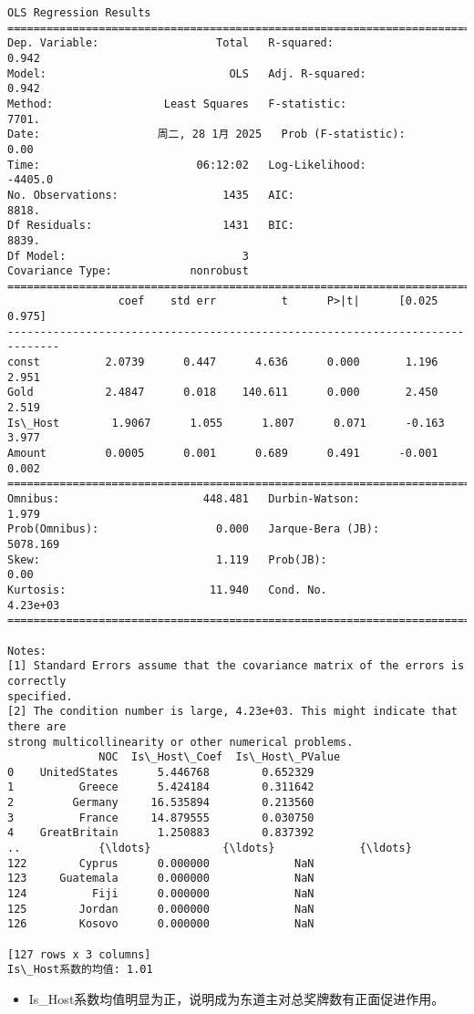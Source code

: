 \documentclass[11pt]{article}
\providecommand{\tightlist}{%
      \setlength{\itemsep}{0pt}\setlength{\parskip}{0pt}}
\begin{document}
    \begin{Verbatim}[commandchars=\\\{\}]
                            OLS Regression Results
==============================================================================
Dep. Variable:                  Total   R-squared:                       0.942
Model:                            OLS   Adj. R-squared:                  0.942
Method:                 Least Squares   F-statistic:                     7701.
Date:                  周二, 28 1月 2025   Prob (F-statistic):               0.00
Time:                        06:12:02   Log-Likelihood:                -4405.0
No. Observations:                1435   AIC:                             8818.
Df Residuals:                    1431   BIC:                             8839.
Df Model:                           3
Covariance Type:            nonrobust
==============================================================================
                 coef    std err          t      P>|t|      [0.025      0.975]
------------------------------------------------------------------------------
const          2.0739      0.447      4.636      0.000       1.196       2.951
Gold           2.4847      0.018    140.611      0.000       2.450       2.519
Is\_Host        1.9067      1.055      1.807      0.071      -0.163       3.977
Amount         0.0005      0.001      0.689      0.491      -0.001       0.002
==============================================================================
Omnibus:                      448.481   Durbin-Watson:                   1.979
Prob(Omnibus):                  0.000   Jarque-Bera (JB):             5078.169
Skew:                           1.119   Prob(JB):                         0.00
Kurtosis:                      11.940   Cond. No.                     4.23e+03
==============================================================================

Notes:
[1] Standard Errors assume that the covariance matrix of the errors is correctly
specified.
[2] The condition number is large, 4.23e+03. This might indicate that there are
strong multicollinearity or other numerical problems.
              NOC  Is\_Host\_Coef  Is\_Host\_PValue
0    UnitedStates      5.446768        0.652329
1          Greece      5.424184        0.311642
2         Germany     16.535894        0.213560
3          France     14.879555        0.030750
4    GreatBritain      1.250883        0.837392
..            {\ldots}           {\ldots}             {\ldots}
122        Cyprus      0.000000             NaN
123     Guatemala      0.000000             NaN
124          Fiji      0.000000             NaN
125        Jordan      0.000000             NaN
126        Kosovo      0.000000             NaN

[127 rows x 3 columns]
Is\_Host系数的均值: 1.01
    \end{Verbatim}

    \begin{itemize}
\tightlist
\item
  Is\_Host系数均值明显为正，说明成为东道主对总奖牌数有正面促进作用。
\end{itemize}


    
    
    
\end{document}
